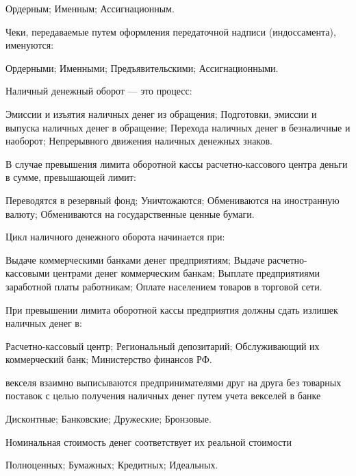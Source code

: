 \documentclass[12pt, table]{exam}
\begin{document}
\begin{questions}
\begin{multicols}{2}
\begin{choices}
	 \CC Ордерным;
	 \choice Именным;
	 \choice Ассигнационным.
	 \end{choices}
\question Чеки, передаваемые путем оформления передаточной надписи (индоссамента), именуются:
	 \begin{choices}
	 \CC Ордерными;
	 \choice Именными;
	 \choice Предъявительскими;
	 \choice Ассигнационными.
	 \end{choices}
\question Наличный денежный оборот — это процесс:
	 \begin{choices}
	 \choice Эмиссии и изъятия наличных денег из обращения;
	 \choice Подготовки, эмиссии и выпуска наличных денег в обращение;
	 \choice Перехода наличных денег в безналичные и наоборот;
	 \CC Непрерывного движения наличных денежных знаков.
	 \end{choices}
\question В случае превышения лимита оборотной кассы расчетно-кассового центра деньги в сумме, превышающей лимит:
	 \begin{choices}
	 \CC Переводятся в резервный фонд;
	 \choice Уничтожаются;
	 \choice Обмениваются на иностранную валюту;
	 \choice Обмениваются на государственные ценные бумаги.
	 \end{choices}
\question Цикл наличного денежного оборота начинается при:
	 \begin{choices}
	 \choice Выдаче коммерческими банками денег предприятиям;
	 \CC Выдаче расчетно-кассовыми центрами денег коммерческим банкам;
	 \choice Выплате предприятиями заработной платы работникам;
	 \choice Оплате населением товаров в торговой сети.
	 \end{choices}
\question При превышении лимита оборотной кассы предприятия должны сдать излишек наличных денег в:
	 \begin{choices}
	 \choice Расчетно-кассовый центр;
	 \choice Региональный депозитарий;
	 \CC Обслуживающий их коммерческий банк;
	 \choice Министерство финансов РФ.
	 \end{choices}
\question  векселя взаимно выписываются предпринимателями друг на друга без товарных поставок с целью получения наличных денег путем учета векселей в банке
	 \begin{choices}
	 \choice Дисконтные;
	 \choice Банковские;
	 \CC Дружеские;
	 \choice Бронзовые.
	 \end{choices}
\question Номинальная стоимость  денег соответствует их реальной стоимости
	 \begin{choices}
	 \CC Полноценных;
	 \choice Бумажных;
	 \choice Кредитных;
	 \choice Идеальных.
	 \end{choices}

\end{multicols}
\end{questions}
\end{document}
